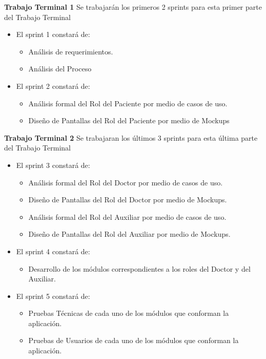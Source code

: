 \textbf{Trabajo Terminal 1}
Se trabajarán los primeros 2 sprints para esta primer parte del Trabajo Terminal
\begin{itemize}
	 
	\item El sprint 1 constará de:
	\begin{itemize}
		\item Análisis de requerimientos.
		\item Análisis del Proceso
	\end{itemize}
	
	\item El sprint 2 constará de:
	\begin{itemize}
		\item Análisis formal del Rol del Paciente por medio de casos de uso.
		\item Diseño de Pantallas del Rol del Paciente por medio de Mockups
	\end{itemize}
\end{itemize}

\textbf{Trabajo Terminal 2}
Se trabajaran los últimos 3 sprints para esta última parte del Trabajo Terminal

\begin{itemize}
	\item El sprint 3 constará de:
	\begin{itemize}
		\item Análisis formal del Rol del Doctor por medio de casos de uso.
		\item Diseño de Pantallas del Rol del Doctor por medio de Mockups.
		\item Análisis formal del Rol del Auxiliar por medio de casos de uso.
		\item Diseño de Pantallas del Rol del Auxiliar por medio de Mockups.
	\end{itemize}
	\item El sprint 4 constará de:
	\begin{itemize}
		\item Desarrollo de los módulos correspondientes a los roles del Doctor y del Auxiliar.
	\end{itemize}
	\item El sprint 5 constará de:
	\begin{itemize}
		\item Pruebas Técnicas de cada uno de los módulos que conforman la aplicación.
		\item Pruebas de Usuarios de cada uno de los módulos que conforman la aplicación.
	\end{itemize}
\end{itemize}

